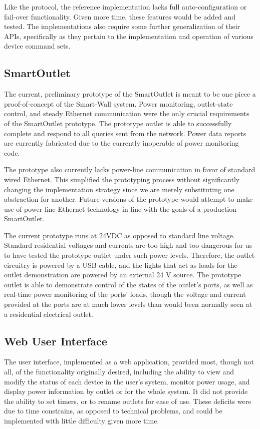 \documentclass[11pt]{article}
\begin{document}
Like the protocol, the reference implementation lacks full
auto-configuration or
fail-over functionality. Given more time, these features would be added
and tested. The implementations also require some further generalization
of their APIs, specifically as they pertain to the implementation and
operation of various device command sets.

\subsection{SmartOutlet}
The current, preliminary prototype of the SmartOutlet is meant to be
one piece a proof-of-concept of the Smart-Wall system.  Power
monitoring, outlet-state control, and steady Ethernet communication
were the only crucial requirements of the SmartOutlet prototype.  The
prototype outlet is able to successfully complete and respond to all
queries sent from the network. Power data reports are currently
fabricated due to the currently inoperable of power monitoring code.

The prototype also currently lacks power-line communication in favor of
standard wired Ethernet. This simplified the prototyping process
without significantly changing the implementation strategy since we are merely
substituting one abstraction for another. Future versions of the
prototype would attempt to make use of power-line Ethernet technology in
line with the goals of a production SmartOutlet.

The current prototype runs at 24VDC as opposed to standard line
voltage. Standard residential voltages and currents are too high and
too dangerous for us to have tested the prototype outlet under
such power levels.  Therefore, the outlet circuitry is powered by a
USB cable, and the lights that act as loads for the outlet
demonstration are powered by an external 24 V source.  The prototype
outlet is able to demonstrate control of the states of the outlet’s
ports, as well as real-time power monitoring of the ports’ loads,
though the voltage and current provided at the ports are at much lower
levels than would been normally seen at a residential electrical outlet.

\subsection{Web User Interface}
The user interface, implemented as a web application, provided
most, though not all, of the functionality originally desired,
including the ability to view and modify the status of each
device in the user’s system, monitor power usage, and display
power information by outlet or for the whole system. It did not
provide the ability to set timers, or to rename outlets for ease
of use. These deficits were due to time constrains, as opposed to
technical problems, and could be implemented with little
difficulty given more time.
\end{document}
